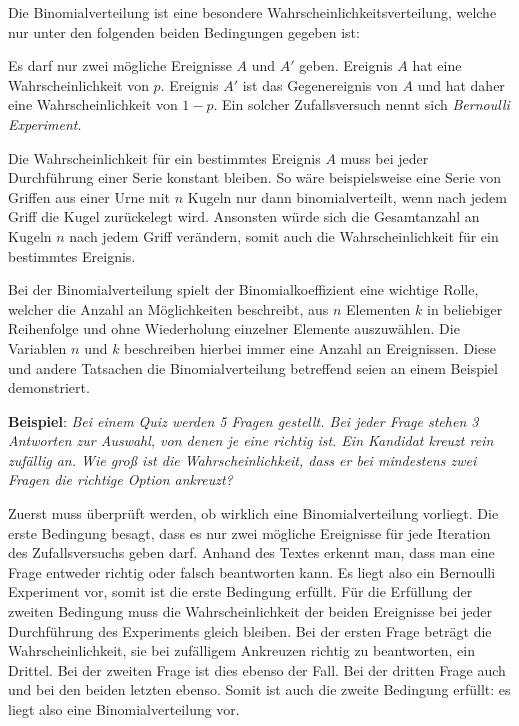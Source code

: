 
Die Binomialverteilung ist eine besondere Wahrscheinlichkeitsverteilung, welche nur unter den folgenden beiden Bedingungen gegeben ist:

\begin{enumerate}


	Es darf nur zwei m\"{o}gliche Ereignisse $A$ und $A'$ geben. Ereignis $A$ hat eine Wahrscheinlichkeit von $p$. Ereignis $A'$ ist das Gegenereignis von $A$ und hat daher eine Wahrscheinlichkeit von $1 - p$. Ein solcher Zufallsversuch nennt sich \emph{Bernoulli Experiment}.


	Die Wahrscheinlichkeit f\"{u}r ein bestimmtes Ereignis $A$ muss bei jeder Durchf\"{u}hrung einer Serie konstant bleiben. So w\"{a}re beispielsweise eine Serie von Griffen aus einer Urne mit $n$ Kugeln nur dann binomialverteilt, wenn nach jedem Griff die Kugel zur\"{u}ckelegt wird. Ansonsten w\"{u}rde sich die Gesamtanzahl an Kugeln $n$ nach jedem Griff ver\"{a}ndern, somit auch die Wahrscheinlichkeit f\"{u}r ein bestimmtes Ereignis.
\end{enumerate}

Bei der Binomialverteilung spielt der Binomialkoeffizient eine wichtige Rolle, welcher die Anzahl an M\"{o}glichkeiten beschreibt, aus $n$ Elementen $k$ in beliebiger Reihenfolge und ohne Wiederholung einzelner Elemente auszuw\"{a}hlen. Die Variablen $n$ und $k$ beschreiben hierbei immer eine Anzahl an Ereignissen. Diese und andere Tatsachen die Binomialverteilung betreffend seien an einem Beispiel demonstriert.

\textbf{Beispiel}: \emph{Bei einem Quiz werden 5 Fragen gestellt. Bei jeder Frage stehen 3 Antworten zur Auswahl, von denen je eine richtig ist. Ein Kandidat kreuzt rein zuf\"{a}llig an. Wie gro\ss{} ist die Wahrscheinlichkeit, dass er bei mindestens zwei Fragen die richtige Option ankreuzt?}

Zuerst muss \"{u}berpr\"{u}ft werden, ob wirklich eine Binomialverteilung vorliegt. Die erste Bedingung besagt, dass es nur zwei m\"{o}gliche Ereignisse f\"{u}r jede Iteration des Zufallsversuchs geben darf. Anhand des Textes erkennt man, dass man eine Frage entweder richtig oder falsch beantworten kann. Es liegt also ein Bernoulli Experiment vor, somit ist die erste Bedingung erf\"{u}llt. F\"{u}r die Erf\"{u}llung der zweiten Bedingung muss die Wahrscheinlichkeit der beiden Ereignisse bei jeder Durchf\"{u}hrung des Experiments gleich bleiben. Bei der ersten Frage betr\"{a}gt die Wahrscheinlichkeit, sie bei zuf\"{a}lligem Ankreuzen richtig zu beantworten, ein Drittel. Bei der zweiten Frage ist dies ebenso der Fall. Bei der dritten Frage auch und bei den beiden letzten ebenso. Somit ist auch die zweite Bedingung erf\"{u}llt: es liegt also eine Binomialverteilung vor.

